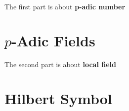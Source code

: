 \documentclass[Total.tex]{subfiles}
\begin{document}
	The first part is about \textbf{p-adic number}
	\chapter{$p$-Adic Fields}
	The second part is about \textbf{local field}
	
	\chapter{Hilbert Symbol}
\end{document}
